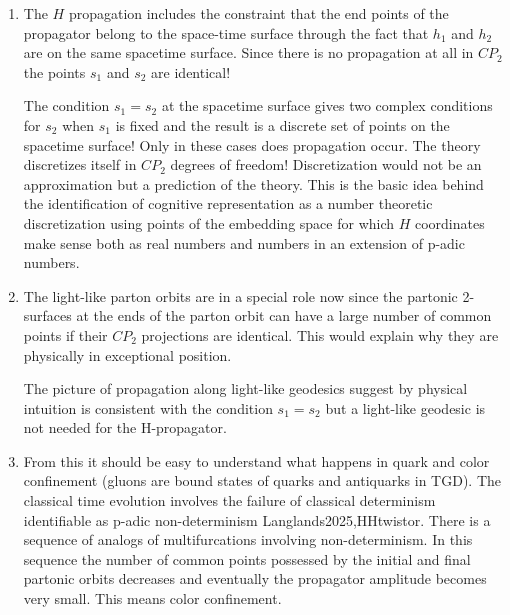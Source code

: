 \documentclass[10pt,epsf]{article}
\begin{document}
\begin{enumerate}

\item  The $H$ propagation includes   the  constraint that the end points of the propagator belong to the space-time surface through the fact that $h_1$   and $h_2$   are on the same spacetime surface. Since there is no   propagation at all in $CP_2$ the  points $s_1$ and $s_2$  are identical!

The condition $s_1=s_2$ at  the spacetime surface gives two complex conditions for $s_2$ when $s_1$ is fixed and the result is a discrete set of points on the spacetime surface! Only in these cases does propagation occur. The theory discretizes itself in $CP_2$ degrees of freedom! Discretization would not be an approximation but a prediction of the theory. This is the basic idea behind the identification of cognitive representation as a  number theoretic discretization using  points of the embedding space for which $H$ coordinates make sense both as real numbers and numbers in an extension of p-adic numbers.

\item The light-like parton orbits  are in a special role now since  the partonic 2-surfaces at the ends  of the parton orbit can have a large number of common points if their $CP_2$  projections are identical. This would explain why they are physically in exceptional position.

The picture of propagation along light-like geodesics  suggest by physical intuition is consistent with the condition $s_1=s_2$ but a light-like geodesic is not needed for the H-propagator. 

\item From this it should be easy to understand what happens in quark and color confinement (gluons are bound states of quarks and antiquarks in TGD). The classical time evolution involves the failure of classical determinism identifiable as p-adic non-determinism \cite{btart}{Langlands2025,HHtwistor}. There is a sequence of analogs of multifurcations involving non-determinism.   In this sequence the number of common points possessed by the initial and final partonic orbits decreases and eventually the propagator amplitude becomes very small.  This means color confinement.

\end{enumerate}





\end{document}
